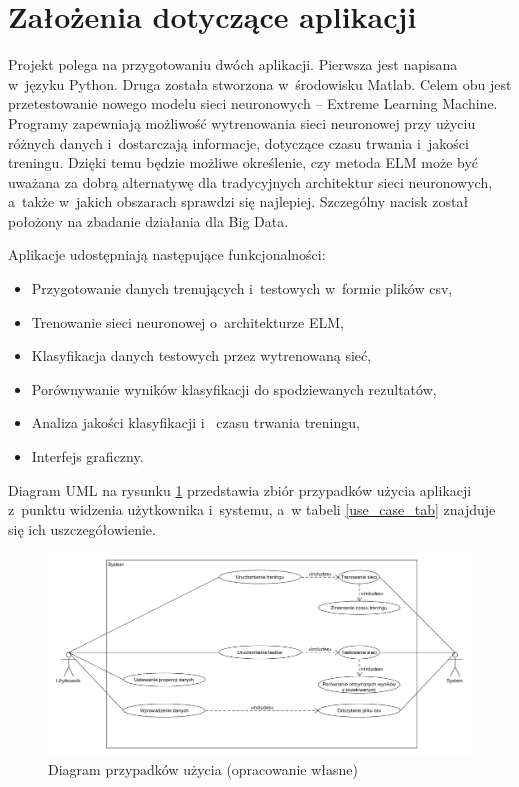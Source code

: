 \documentclass[pl]{minipw} %
\begin{document}
\section{Założenia dotyczące aplikacji}
Projekt polega na przygotowaniu dwóch aplikacji. Pierwsza jest napisana w~języku Python. Druga została stworzona w~środowisku Matlab. Celem obu jest przetestowanie nowego modelu sieci neuronowych -- Extreme Learning Machine. Programy zapewniają możliwość wytrenowania sieci neuronowej przy użyciu różnych danych i~dostarczają informacje, dotyczące czasu trwania i~jakości treningu. Dzięki temu będzie możliwe określenie, czy metoda ELM może być uważana za dobrą alternatywę dla tradycyjnych architektur sieci neuronowych, a~także w~jakich obszarach sprawdzi się najlepiej. Szczególny nacisk został położony na zbadanie działania dla Big Data.

Aplikacje udostępniają następujące funkcjonalności:
\begin{itemize}
\item Przygotowanie danych trenujących i~testowych w~formie plików csv,
\item Trenowanie sieci neuronowej o~architekturze ELM,
\item Klasyfikacja danych testowych przez wytrenowaną sieć,
\item Porównywanie wyników klasyfikacji do spodziewanych rezultatów,
\item Analiza jakości klasyfikacji i~ czasu trwania treningu,
\item Interfejs graficzny.
\end{itemize}
Diagram UML na rysunku \ref{use_case} przedstawia zbiór przypadków użycia aplikacji z~punktu widzenia użytkownika i~systemu, a~w tabeli \ref{use_case_tab} znajduje się ich uszczegółowienie.
\begin{figure}[H]
\includegraphics[width=\textwidth]{use_case.png}
\caption[Diagram przypadków użycia]{Diagram przypadków użycia (opracowanie własne)}
\label{use_case}
\end{figure}
\end{document}
